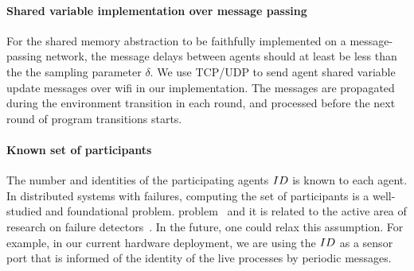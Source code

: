 \paragraph*{Shared variable implementation over message passing}
For the shared memory abstraction to be faithfully implemented on a message-passing  network, the message delays between agents should at least be less than the the sampling parameter $\delta$. We use TCP/UDP to send agent shared variable update messages over wifi in our implementation. The messages are propagated during the environment transition in each round, and processed before the next round of program transitions starts.

\paragraph*{Known set of participants}
The number and identities of the participating agents $ID$ is known to each agent. In distributed systems with failures, computing the set of participants is a well-studied and foundational problem. problem~\cite{AlistarhAGG2011} and it is related to the active area of research on failure detectors~\cite{Chandra:1996,delporte2004weakest}. In the future, one could  relax this  assumption. For example, in our current hardware deployment, we are using the $ID$ as a sensor port that is informed of the identity of the live processes by periodic messages. 

%
%
%


